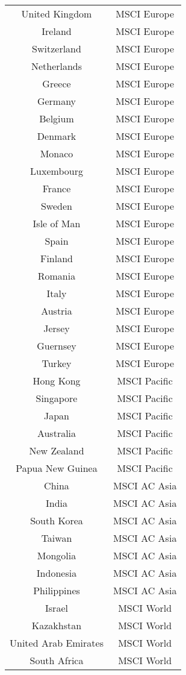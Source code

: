 \documentclass[12pt]{article}
\begin{document}
\begin{longtable}[c]{cc}
       United Kingdom & MSCI Europe  \\
       Ireland & MSCI Europe  \\
       Switzerland & MSCI Europe  \\
       Netherlands & MSCI Europe  \\
       Greece & MSCI Europe  \\
       Germany & MSCI Europe  \\
       Belgium & MSCI Europe  \\
       Denmark & MSCI Europe  \\
       Monaco & MSCI Europe  \\
       Luxembourg & MSCI Europe  \\
       France & MSCI Europe  \\
       Sweden & MSCI Europe  \\
       Isle of Man & MSCI Europe  \\
       Spain & MSCI Europe  \\
       Finland & MSCI Europe  \\
       Romania & MSCI Europe  \\
       Italy & MSCI Europe  \\
       Austria & MSCI Europe  \\
       Jersey & MSCI Europe  \\
       Guernsey & MSCI Europe  \\
       Turkey & MSCI Europe  \\
       
       
       Hong Kong & MSCI Pacific  \\
       Singapore & MSCI Pacific  \\
       Japan & MSCI Pacific  \\
       Australia & MSCI Pacific  \\
       New Zealand & MSCI Pacific  \\
       Papua New Guinea & MSCI Pacific  \\
       
       China & MSCI AC Asia  \\
       India & MSCI AC Asia  \\
       South Korea & MSCI AC Asia  \\
       Taiwan & MSCI AC Asia  \\
       Mongolia & MSCI AC Asia  \\
       Indonesia & MSCI AC Asia  \\
       Philippines & MSCI AC Asia  \\
       
       Israel & MSCI World  \\
       Kazakhstan & MSCI World  \\
       United Arab Emirates & MSCI World  \\
       South Africa & MSCI World \\
    
\end{longtable}
\end{document}
